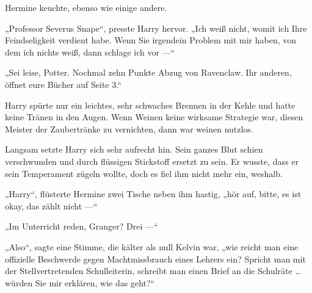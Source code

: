 Hermine keuchte, ebenso wie einige andere.

„Professor Severus Snape“, presste Harry hervor.
„Ich weiß nicht, womit ich Ihre Feindseligkeit verdient habe. Wenn Sie irgendein Problem mit mir haben, von dem ich nichts weiß, dann schlage ich vor —“

„Sei leise, Potter. Nochmal zehn Punkte Abzug von Ravenclaw. Ihr anderen, öffnet eure Bücher auf Seite 3.“

Harry spürte nur ein leichtes, sehr schwaches Brennen in der Kehle und hatte keine Tränen in den Augen. Wenn Weinen keine wirksame Strategie war, diesen Meister der Zaubertränke zu vernichten, dann war weinen nutzlos.

Langsam setzte Harry sich sehr aufrecht hin. Sein ganzes Blut schien verschwunden und durch flüssigen Stickstoff ersetzt zu sein. Er wusste, dass er sein Temperament zügeln wollte, doch es fiel ihm nicht mehr ein, weshalb.

„Harry“, flüsterte Hermine zwei Tische neben ihm hastig, „hör auf, bitte, es ist okay, das zählt nicht —“

„Im Unterricht reden, Granger? Drei —“

„Also“, sagte eine Stimme, die kälter als null Kelvin war, „wie reicht man eine offizielle Beschwerde gegen Machtmissbrauch eines Lehrers ein? Spricht man mit der Stellvertretenden Schulleiterin, schreibt man einen Brief an die Schulräte … würden Sie mir erklären, wie das geht?“

